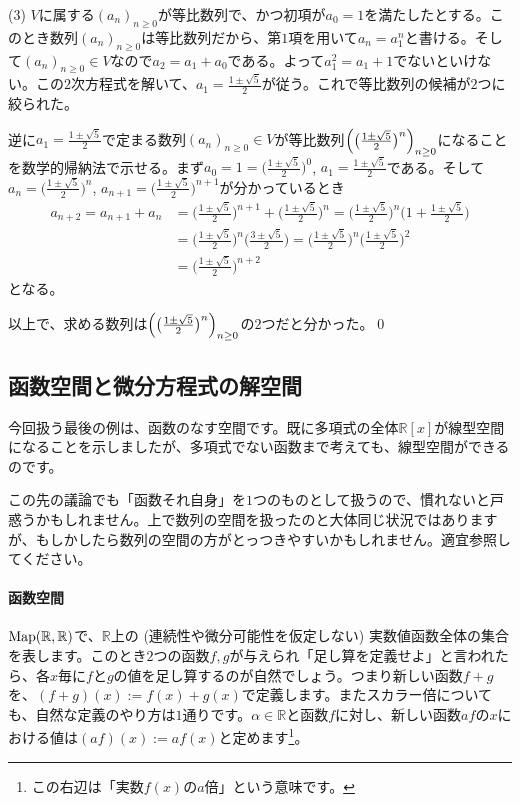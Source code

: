 (3) $V$に属する$(a_n)_{n \geq 0}$が等比数列で、かつ初項が$a_0 = 1$を満たしたとする。このとき数列$(a_n)_{n \geq 0}$は等比数列だから、第$1$項を用いて$a_n = a_1^n$と書ける。そして$(a_n)_{n \geq 0}\in V$なので$a_2 = a_1 + a_0$である。よって$a_1^2 = a_1 + 1$でないといけない。この$2$次方程式を解いて、$a_1 = \frac{1 \pm \sqrt{5}}{2}$が従う。これで等比数列の候補が$2$つに絞られた。

逆に$a_1 = \frac{1 \pm \sqrt{5}}{2}$で定まる数列$(a_n)_{n \geq 0} \in V$が等比数列$\Bigl(\bigl(\frac{1 \pm \sqrt{5}}{2}\bigr)^n\Bigr)_{n \geq 0}$になることを数学的帰納法で示せる。まず$a_0 = 1 = \bigl(\frac{1 \pm \sqrt{5}}{2}\bigr)^0$, $a_1 = \frac{1 \pm \sqrt{5}}{2}$である。そして$a_n = \bigl( \frac{1 \pm \sqrt{5}}{2} \bigr)^n$, $a_{n + 1} = \bigl(\frac{1 \pm \sqrt{5}}{2}\bigr)^{n+1}$が分かっているとき
\begin{align*}
a_{n + 2} = a_{n + 1} + a_n 
&= \biggl(\frac{1 \pm \sqrt{5}}{2}\biggr)^{n + 1} + \biggl(\frac{1 \pm \sqrt{5}}{2}\biggr)^n
= \biggl(\frac{1 \pm \sqrt{5}}{2}\biggr)^n\biggl(1 + \frac{1 \pm \sqrt{5}}{2}\biggr) \\
&= \biggl(\frac{1 \pm \sqrt{5}}{2}\biggr)^n \biggl(\frac{3 \pm \sqrt{5}}{2}\biggr)
= \biggl(\frac{1 \pm \sqrt{5}}{2}\biggr)^n \biggl(\frac{1 \pm \sqrt{5}}{2}\biggr)^2 \\
&= \biggl(\frac{1 \pm \sqrt{5}}{2}\biggr)^{n+2}
\end{align*}
となる。

以上で、求める数列は$\Bigl(\bigl(\frac{1 \pm \sqrt{5}}{2}\bigr)^n\Bigr)_{n \geq 0}$の$2$つだと分かった。\qed

\subsection{函数空間と微分方程式の解空間}

今回扱う最後の例は、函数のなす空間です。既に多項式の全体$\mathbb{R}[x]$が線型空間になることを示しましたが、多項式でない函数まで考えても、線型空間ができるのです。

この先の議論でも「函数それ自身」を$1$つのものとして扱うので、慣れないと戸惑うかもしれません。上で数列の空間を扱ったのと大体同じ状況ではありますが、もしかしたら数列の空間の方がとっつきやすいかもしれません。適宜参照してください。

\paragraph{函数空間}

$\operatorname{Map}(\mathbb{R}, \mathbb{R})$で、$\mathbb{R}$上の (連続性や微分可能性を仮定しない) 実数値函数全体の集合を表します。このとき$2$つの函数$f, g$が与えられ「足し算を定義せよ」と言われたら、各$x$毎に$f$と$g$の値を足し算するのが自然でしょう。つまり新しい函数$f + g$を、$(f + g)(x) := f(x) + g(x)$で定義します。またスカラー倍についても、自然な定義のやり方は$1$通りです。$\alpha\in\mathbb{R}$と函数$f$に対し、新しい函数$af$の$x$における値は$(af)(x) := af(x)$と定めます\footnote{この右辺は「実数$f(x)$の$a$倍」という意味です。}。

